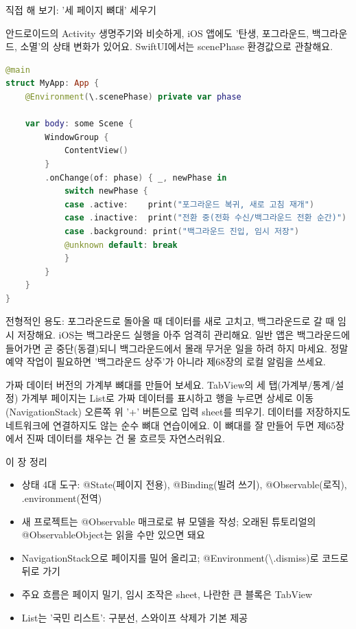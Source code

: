 \begin{tcbpractice}{직접 해 보기: '세 페이지 뼈대' 세우기}

안드로이드의 Activity 생명주기와 비슷하게, iOS 앱에도 '탄생, 포그라운드, 백그라운드, 소멸'의 상태 변화가 있어요. SwiftUI에서는 scenePhase 환경값으로 관찰해요.

\begin{lstlisting}[language=Swift]
@main
struct MyApp: App {
    @Environment(\.scenePhase) private var phase

    var body: some Scene {
        WindowGroup {
            ContentView()
        }
        .onChange(of: phase) { _, newPhase in
            switch newPhase {
            case .active:    print("포그라운드 복귀, 새로 고침 재개")
            case .inactive:  print("전환 중(전화 수신/백그라운드 전환 순간)")
            case .background: print("백그라운드 진입, 임시 저장")
            @unknown default: break
            }
        }
    }
}
\end{lstlisting}

전형적인 용도: 포그라운드로 돌아올 때 데이터를 새로 고치고, 백그라운드로 갈 때 임시 저장해요. iOS는 백그라운드 실행을 아주 엄격히 관리해요. 일반 앱은 백그라운드에 들어가면 곧 중단(동결)되니 백그라운드에서 몰래 무거운 일을 하려 하지 마세요. 정말 예약 작업이 필요하면 '백그라운드 상주'가 아니라 제68장의 로컬 알림을 쓰세요.

가짜 데이터 버전의 가계부 뼈대를 만들어 보세요. TabView의 세 탭(가계부/통계/설정) 가계부 페이지는 List로 가짜 데이터를 표시하고 행을 누르면 상세로 이동(NavigationStack) 오른쪽 위 '+' 버튼으로 입력 sheet를 띄우기. 데이터를 저장하지도 네트워크에 연결하지도 않는 순수 뼈대 연습이에요. 이 뼈대를 잘 만들어 두면 제65장에서 진짜 데이터를 채우는 건 물 흐르듯 자연스러워요.

\end{tcbpractice}

\begin{tcbsummary}{이 장 정리}
\begin{itemize}
  \item 상태 4대 도구: @State(페이지 전용), @Binding(빌려 쓰기), @Observable(로직), .environment(전역)
  \item 새 프로젝트는 @Observable 매크로로 뷰 모델을 작성; 오래된 튜토리얼의 @ObservableObject는 읽을 수만 있으면 돼요
  \item NavigationStack으로 페이지를 밀어 올리고; @Environment(\textbackslash{}.dismiss)로 코드로 뒤로 가기
  \item 주요 흐름은 페이지 밀기, 임시 조작은 sheet, 나란한 큰 블록은 TabView
  \item List는 '국민 리스트': 구분선, 스와이프 삭제가 기본 제공
\end{itemize}

\end{tcbsummary}
